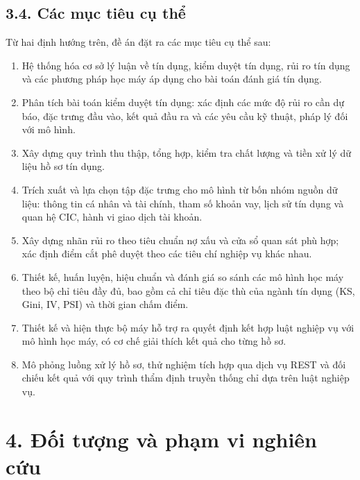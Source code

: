 \subsection*{3.4. Các mục tiêu cụ thể}

Từ hai định hướng trên, đề án đặt ra các mục tiêu cụ thể sau:

\begin{enumerate}[label=(\arabic*)]
  \item Hệ thống hóa cơ sở lý luận về tín dụng, kiểm duyệt tín dụng, rủi ro tín
  dụng và các phương pháp học máy áp dụng cho bài toán đánh giá tín dụng.

  \item Phân tích bài toán kiểm duyệt tín dụng: xác định các mức độ rủi ro cần dự
  báo, đặc trưng đầu vào, kết quả đầu ra và các yêu cầu kỹ thuật, pháp lý đối với
  mô hình.

  \item Xây dựng quy trình thu thập, tổng hợp, kiểm tra chất lượng và tiền xử lý
  dữ liệu hồ sơ tín dụng.

  \item Trích xuất và lựa chọn tập đặc trưng cho mô hình từ bốn nhóm nguồn dữ
  liệu: thông tin cá nhân và tài chính, tham số khoản vay, lịch sử tín dụng và
  quan hệ CIC, hành vi giao dịch tài khoản.

  \item Xây dựng nhãn rủi ro theo tiêu chuẩn nợ xấu và cửa sổ quan sát phù hợp;
  xác định điểm cắt phê duyệt theo các tiêu chí nghiệp vụ khác nhau.

  \item Thiết kế, huấn luyện, hiệu chuẩn và đánh giá so sánh các mô hình học máy
  theo bộ chỉ tiêu đầy đủ, bao gồm cả chỉ tiêu đặc thù của ngành tín dụng (KS,
  Gini, IV, PSI) và thời gian chấm điểm.

  \item Thiết kế và hiện thực bộ máy hỗ trợ ra quyết định kết hợp luật nghiệp vụ
  với mô hình học máy, có cơ chế giải thích kết quả cho từng hồ sơ.

  \item Mô phỏng luồng xử lý hồ sơ, thử nghiệm tích hợp qua dịch vụ REST và đối
  chiếu kết quả với quy trình thẩm định truyền thống chỉ dựa trên luật nghiệp vụ.
\end{enumerate}

\section*{4. Đối tượng và phạm vi nghiên cứu}

